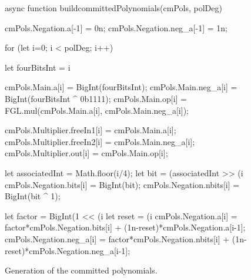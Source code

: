 \begin{figure}[H]
    \begin{js}
        async function buildcommittedPolynomials(cmPols, polDeg) {
            
            cmPols.Negation.a[-1] = 0n;
            cmPols.Negation.neg_a[-1] = 1n;
            
            for (let i=0; i < polDeg; i++) {
                
                let fourBitsInt = i %
                
                cmPols.Main.a[i] = BigInt(fourBitsInt);
                cmPols.Main.neg_a[i] = BigInt(fourBitsInt ^ 0b1111);
                cmPols.Main.op[i] = FGL.mul(cmPols.Main.a[i], cmPols.Main.neg_a[i]);
                
                cmPols.Multiplier.freeIn1[i] = cmPols.Main.a[i];
                cmPols.Multiplier.freeIn2[i] = cmPols.Main.neg_a[i];
                cmPols.Multiplier.out[i] = cmPols.Main.op[i];
                
                let associatedInt = Math.floor(i/4);
                let bit = (associatedInt >> (i%
                cmPols.Negation.bits[i] = BigInt(bit);
                cmPols.Negation.nbits[i] = BigInt(bit ^ 1);
                
                
                let factor = BigInt(1 << (i %
                let reset = (i %
                cmPols.Negation.a[i] = factor*cmPols.Negation.bits[i] 
                + (1n-reset)*cmPols.Negation.a[i-1];
                cmPols.Negation.neg_a[i] = factor*cmPols.Negation.nbits[i] 
                + (1n-reset)*cmPols.Negation.neg_a[i-1];
            }
        }
    \end{js}
    \caption{Generation of the committed polynomials.}
\end{figure}

